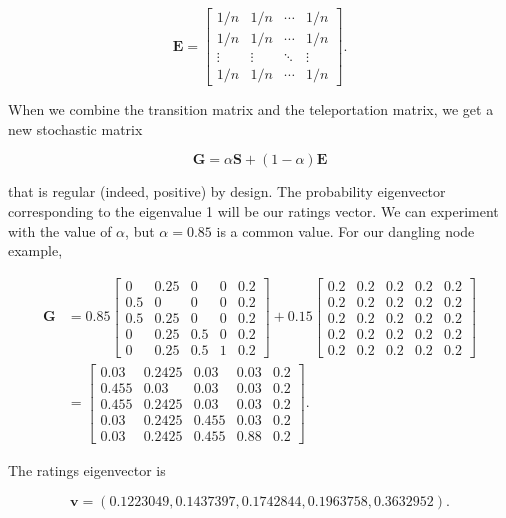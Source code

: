 \documentclass[
]{book}
\theoremstyle{definition}
\theoremstyle{definition}
\theoremstyle{definition}
\theoremstyle{definition}
\theoremstyle{remark}
\begin{document}
\[\mathbf{E}=\begin{bmatrix} 1/n & 1/n & \cdots & 1/n\\
1/n & 1/n & \cdots & 1/n\\
\vdots & \vdots & \ddots & \vdots \\
1/n & 1/n & \cdots & 1/n \end{bmatrix}.\]

When we combine the transition matrix and the teleportation matrix, we get a new stochastic matrix

\[\textbf{G}=\alpha \textbf{S}\textbf{}+(1-\alpha)\textbf{E}\]

that is regular (indeed, positive) by design. The probability eigenvector corresponding to the eigenvalue 1 will be our ratings vector. We can experiment with the value of \(\alpha\), but \(\alpha = 0.85\) is a common value. For our dangling node example,

\begin{align*}
\mathbf{G}&=0.85\begin{bmatrix} 0 & 0.25 & 0 & 0 & 0.2\\
0.5 & 0 & 0 & 0 & 0.2\\
0.5 & 0.25 & 0 & 0 & 0.2\\
0 & 0.25 & 0.5 & 0 & 0.2\\0 & 0.25 & 0.5 & 1 & 0.2\end{bmatrix}+0.15\begin{bmatrix} 0.2 & 0.2 & 0.2 & 0.2 & 0.2\\
0.2 & 0.2 & 0.2 & 0.2 & 0.2\\
0.2 & 0.2 & 0.2 & 0.2 & 0.2\\
0.2 & 0.2 & 0.2 & 0.2 & 0.2\\
0.2 & 0.2 & 0.2 & 0.2 & 0.2 \end{bmatrix}\\
&=\begin{bmatrix}
0.03 & 0.2425 & 0.03 & 0.03 & 0.2\\
0.455 & 0.03 & 0.03 & 0.03 & 0.2\\
0.455 & 0.2425 & 0.03 & 0.03 & 0.2\\
0.03 & 0.2425 & 0.455 & 0.03 & 0.2\\
0.03 & 0.2425 & 0.455 & 0.88 & 0.2
\end{bmatrix}.
\end{align*}

The ratings eigenvector is

\[\mathbf{v}=(0.1223049, 0.1437397, 0.1742844, 0.1963758, 0.3632952).\]
\end{document}
